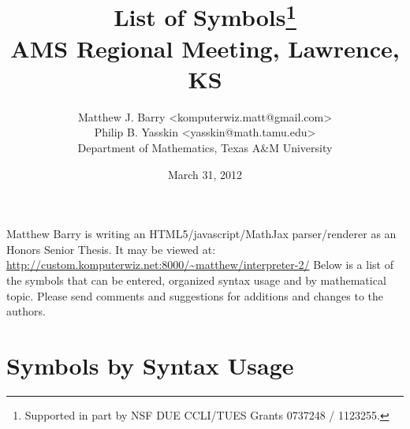 \documentclass{article}
\begin{document}
  \title{List of Symbols\thanks{Supported in part by NSF DUE CCLI/TUES Grants 0737248 / 1123255.}\\
  AMS Regional Meeting, Lawrence, KS}
  \author{Matthew J. Barry  <komputerwiz.matt@gmail.com> \\
          Philip B. Yasskin <yasskin@math.tamu.edu>\\
          Department of Mathematics, Texas A\&M University}
  \date{March 31, 2012}
  \maketitle
  
  \vspace{-15 pt}
  
  Matthew Barry is writing an HTML5/javascript/MathJax parser/renderer as an Honors Senior Thesis. It may be viewed at: \qquad \url{http://custom.komputerwiz.net:8000/~matthew/interpreter-2/} \qquad
  Below is a list of the symbols that can be entered, organized syntax usage and by mathematical topic. Please send comments and suggestions for additions and changes to the authors.
  
  \vspace{-10 pt}

  \section{Symbols by Syntax Usage} %
  \label{sec:syntax}
\end{document}
